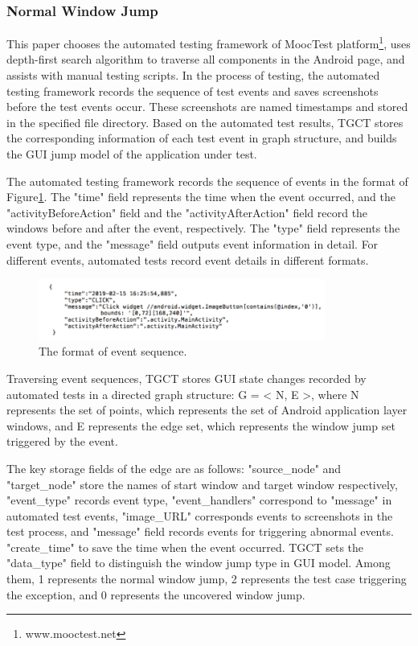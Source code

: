 \subsubsection{Normal Window Jump}
This paper chooses the automated testing framework of MoocTest platform\footnote{www.mooctest.net}, uses depth-first search algorithm to traverse all components in the Android page, and assists with manual testing scripts. In the process of testing, the automated testing framework records the sequence of test events and saves screenshots before the test events occur. These screenshots are named timestamps and stored in the specified file directory. Based on the automated test results, TGCT stores the corresponding information of each test event in graph structure, and builds the GUI jump model of the application under test.

The automated testing framework records the sequence of events in the format of Figure\ref{fig:foramt}. The "time" field represents the time when the event occurred, and the "activityBeforeAction" field and the "activityAfterAction" field record the windows before and after the event, respectively. The "type" field represents the event type, and the "message" field outputs event information in detail. For different events, automated tests record event details in different formats.
\begin{figure}[htbp]
\centering
\centerline{\includegraphics[width=\columnwidth,height=2cm]{fig/4.png}}
\caption{The format of event sequence.}
\label{fig:foramt}
\end{figure}

Traversing event sequences, TGCT stores GUI state changes recorded by automated tests in a directed graph structure: G = < N, E >, where N represents the set of points, which represents the set of Android application layer windows, and E represents the edge set, which represents the window jump set triggered by the event. 

The key storage fields of the edge are as follows: "source\_node" and "target\_node" store the names of start window and target window respectively, "event\_type" records event type, "event\_handlers" correspond to "message" in automated test events, "image\_URL" corresponds events to screenshots in the test process, and "message" field records events for triggering abnormal events. "create\_time" to save the time when the event occurred. TGCT sets the "data\_type" field to distinguish the window jump type in GUI model. Among them, 1 represents the normal window jump, 2 represents the test case triggering the exception, and 0 represents the uncovered window jump.

